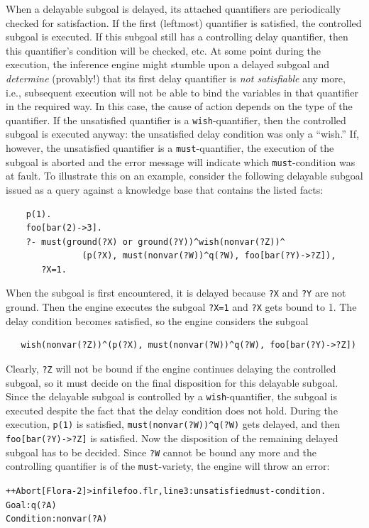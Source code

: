 \documentclass[11pt]{article}
\newcommand{\errorsystem}{Flora-2}
\newcommand{\flrext}{flr\xspace}
\begin{document}
When a delayable subgoal is delayed, its attached quantifiers are
periodically checked for satisfaction. If the first (leftmost) quantifier
is satisfied, the controlled subgoal is executed. If this subgoal still has
a controlling delay quantifier, then this quantifier's condition will be
checked, etc.  At some point during the execution, the inference engine
might stumble upon a delayed subgoal and \emph{determine} (provably!)  that
its first delay quantifier is \emph{not satisfiable} any more, i.e.,
subsequent execution will not be able to bind the variables in that
quantifier in the required way.  In this case, the cause of action depends
on the type of the quantifier.  If the unsatisfied quantifier is a
\texttt{wish}-quantifier, then the controlled subgoal is executed anyway:
the unsatisfied delay condition was only a ``wish.'' If, however, the
unsatisfied quantifier is a \texttt{must}-quantifier, the execution of the
subgoal is aborted and the error message will indicate which
\texttt{must}-condition was at fault.  To illustrate this on an example,
consider the following delayable subgoal issued as a query against a
knowledge base that contains the listed facts:
\begin{verbatim}
    p(1).
    foo[bar(2)->3].
    ?- must(ground(?X) or ground(?Y))^wish(nonvar(?Z))^
               (p(?X), must(nonvar(?W))^q(?W), foo[bar(?Y)->?Z]),
       ?X=1.
\end{verbatim}
When the subgoal is first encountered, it is delayed because \texttt{?X}
and \texttt{?Y} are not ground. Then the engine executes the subgoal
\texttt{?X=1} and \texttt{?X} gets bound to 1. The
delay condition becomes satisfied, so the engine considers the subgoal
\begin{verbatim}
   wish(nonvar(?Z))^(p(?X), must(nonvar(?W))^q(?W), foo[bar(?Y)->?Z])
\end{verbatim}
Clearly, \texttt{?Z} will not be bound if the engine continues delaying the
controlled subgoal, so it must decide on the final disposition for this
delayable subgoal. Since the delayable subgoal
is controlled by a \texttt{wish}-quantifier,
the subgoal is executed despite the fact that the delay condition does not
hold. During the execution, \texttt{p(1)} is
satisfied, \texttt{must(nonvar(?W))\^{}q(?W)} gets delayed, and then
\texttt{foo[bar(?Y)->?Z]} is satisfied. 
Now the disposition of the remaining delayed subgoal has to be decided.
Since \texttt{?W} cannot be bound any more and the controlling quantifier
is of the \texttt{must}-variety, the engine will throw an error:
\begin{alltt}
++Abort[\errorsystem]> in file foo.\flrext, line 3: unsatisfied must-condition.
	Goal: q(?A)
	Condition: nonvar(?A)
\end{alltt}
\end{document}
